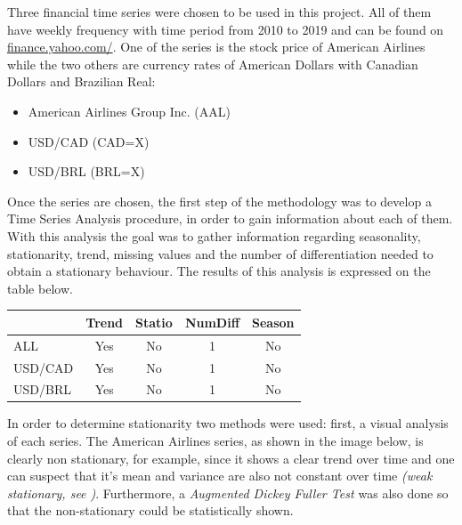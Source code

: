 \documentclass[10pt,twocolumn,letterpaper]{article}
\begin{document}
Three financial time series were chosen to be used in this project. All of them have weekly frequency with time period from 2010 to 2019 and can be found on \url{finance.yahoo.com/}. One of the series is the stock price of American Airlines while the two others are currency rates of American Dollars with Canadian Dollars and Brazilian Real:
\begin{itemize}
	\item American Airlines Group Inc. (AAL)
	\item USD/CAD (CAD=X)
	\item USD/BRL (BRL=X)
\end{itemize}

Once the series are chosen, the first step of the methodology was to develop a Time Series Analysis procedure, in order to gain information about each of them. With this analysis the goal was to gather information regarding seasonality, stationarity, trend, missing values and the number of differentiation needed to obtain a stationary behaviour. The results of this analysis is expressed on the table below.

\begin{table}[h]
	\centering
	\begin{tabular}{|l|c|c|c|c|}
		\hline
		& \multicolumn{1}{l|}{Trend} & \multicolumn{1}{l|}{Statio} & \multicolumn{1}{l|}{NumDiff} & \multicolumn{1}{l|}{Season} \\ \hline
		ALL     & Yes                        & No                              & 1                              & No                            \\ \hline
		USD/CAD & Yes                        & No                              & 1                              & No                            \\ \hline
		USD/BRL & Yes                        & No                              & 1                              & No                            \\ \hline
	\end{tabular}
\end{table}

In order to determine stationarity two methods were used: first, a visual analysis of each series. The American Airlines series, as shown in the image below, is clearly non stationary, for example, since it shows a clear trend over time and one can suspect that it's mean and variance are also not constant over time \textit{(weak stationary, see \cite{tsay2005analysis})}. Furthermore, a \textit{Augmented Dickey Fuller Test \cite{tsay2005analysis}} was also done so that the non-stationary could be statistically shown. 
\end{document}
